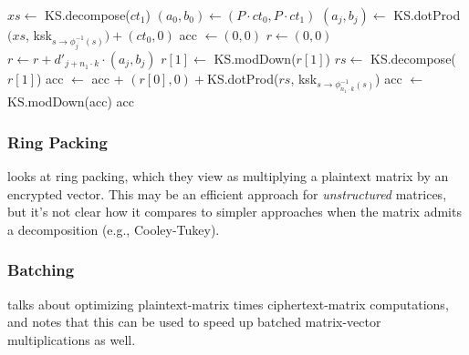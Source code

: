\documentclass[../fheimpl.tex]{subfiles}
\begin{document}
\begin{algorithm}
\begin{algorithmic}[1]
                \State $xs \gets$ KS.decompose($ct_1$)
                \State $(a_0, b_0) \gets (P\cdot ct_0, P\cdot ct_1)$
                    \State $(a_j, b_j) \gets$ KS.dotProd$(xs$, ksk$_{s\rightarrow \phi^{-1}_{j}(s)}) + (ct_0, 0)$
                \EndFor
                \State acc $\gets (0,0)$
                    \State $r\gets (0,0)$
                        \State $r \gets r +  d'_{j+n_1\cdot k}\cdot (a_j, b_j)$
                    \EndFor
                    \State $r[1] \gets$ KS.modDown($r[1]$)
                    \State $rs \gets$ KS.decompose($r[1]$)
                    \State acc $\gets$ acc + $(r[0], 0) + $KS.dotProd($rs$, ksk$_{s \rightarrow \phi^{-1}_{n_1\cdot k}(s)}$)
                \EndFor
                \State acc $\gets$ KS.modDown(acc)
                \State \Return acc
            \EndProcedure
		\end{algorithmic}
    \end{algorithm}

    \subsubsection{Ring Packing}
    \cite{cryptoeprint:2023/1244} looks at ring packing, which they view as multiplying a plaintext matrix by an encrypted vector. This may be an efficient approach for \emph{unstructured} matrices, but it's not clear how it compares to simpler approaches when the matrix admits a decomposition (e.g., Cooley-Tukey).

    \subsubsection{Batching}
    \label{sec:la-batching}
    \cite{cryptoeprint:2024/1284} talks about optimizing plaintext-matrix times ciphertext-matrix computations, and notes that this can be used to speed up batched matrix-vector multiplications as well. 

    \ifcompileasbook
    \else
	\printbibliography
    \fi
	
\end{document}
